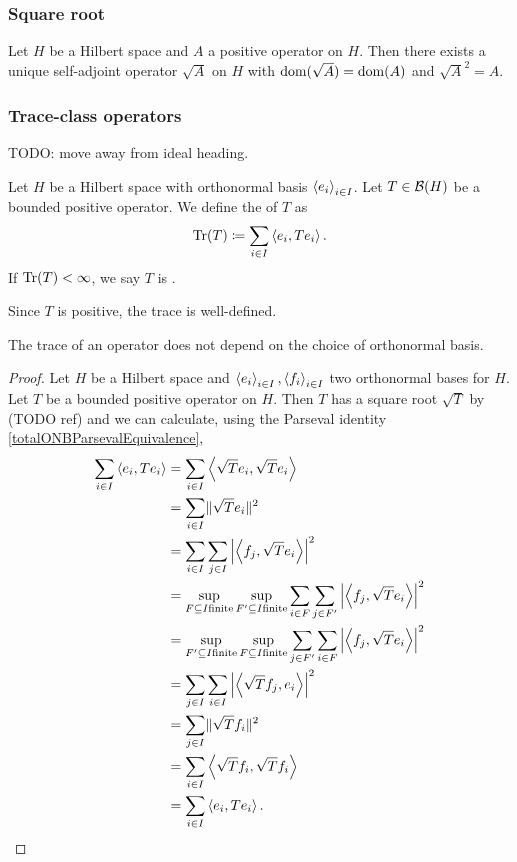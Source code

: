 \subsubsection{Square root}
\begin{proposition} \label{squareRootUnboundedOperator}
Let $H$ be a Hilbert space and $A$ a positive operator on $H$. Then there exists a unique self-adjoint operator $\sqrt{A}$ on $H$ with $\operatorname{dom}(\sqrt{A}) = \operatorname{dom}(A)$ and $\sqrt{A}^2 = A$.
\end{proposition}


\subsubsection{Trace-class operators}
TODO: move away from ideal heading.

\begin{definition}
Let $H$ be a Hilbert space with orthonormal basis $\left\langle e_i \right\rangle_{i\in I}$. Let $T\in\operatorname{\mathcal{B}}(H)$ be a bounded positive operator. We define the  of $T$ as
\[ \operatorname{Tr}(T) \coloneqq \sum_{i\in I}\left\langle e_i, Te_i \right\rangle. \]
If $\operatorname{Tr}(T) < \infty$, we say $T$ is .
\end{definition}
Since $T$ is positive, the trace is well-defined.

\begin{lemma}
The trace of an operator does not depend on the choice of orthonormal basis.
\end{lemma}
\begin{proof}
Let $H$ be a Hilbert space and $\left\langle e_i \right\rangle_{i\in I}, \left\langle f_i \right\rangle_{i\in I}$ two orthonormal bases for $H$. Let $T$ be a bounded positive operator on $H$. Then $T$ has a square root $\sqrt{T}$ by (TODO ref) and we can calculate, using the Parseval identity \ref{totalONBParsevalEquivalence},
\begin{align*}
\sum_{i\in I}\left\langle e_i, Te_i \right\rangle &= \sum_{i\in I}\left\langle \sqrt{T}e_i, \sqrt{T}e_i \right\rangle \\
&= \sum_{i\in I}\lVert\sqrt{T}e_i\rVert^2 \\
&= \sum_{i\in I}\sum_{j\in I}\left|\left\langle f_j, \sqrt{T}e_i \right\rangle\right|^2 \\
&= \sup_{F\subseteq I \text{finite}}\sup_{F'\subseteq I \text{finite}}\sum_{i\in F}\sum_{j\in F'}\left|\left\langle f_j, \sqrt{T}e_i \right\rangle\right|^2 \\
&= \sup_{F'\subseteq I \text{finite}}\sup_{F\subseteq I \text{finite}}\sum_{j\in F'}\sum_{i\in F}\left|\left\langle f_j, \sqrt{T}e_i \right\rangle\right|^2 \\
&= \sum_{j\in I}\sum_{i\in I}\left|\left\langle \sqrt{T}f_j, e_i \right\rangle\right|^2 \\
&= \sum_{j\in I}\lVert\sqrt{T}f_i\rVert^2 \\
&= \sum_{i\in I}\left\langle \sqrt{T}f_i, \sqrt{T}f_i \right\rangle \\
&= \sum_{i\in I}\left\langle e_i, Te_i \right\rangle.
\end{align*} 
\end{proof}


